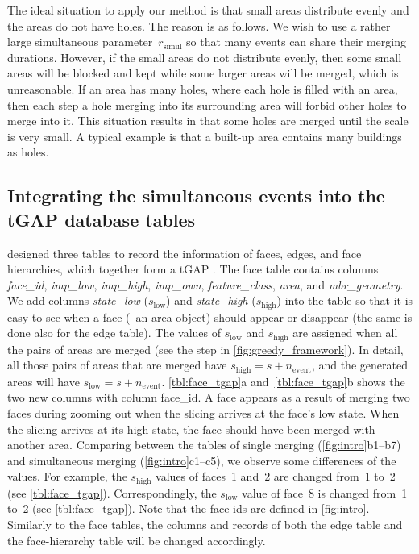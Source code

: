 \documentclass[twocolumn]{svjour3}          %
\begin{document}
The ideal situation to apply our method is that 
small areas distribute evenly and the areas do not have holes.
The reason is as follows.
We wish to use a rather large simultaneous parameter~$r_\mathrm{simul}$
so that many events can share their merging durations.
However, if the small areas do not distribute evenly,
then some small areas will be blocked and kept 
while some larger areas will be merged,
which is unreasonable.
If an area has many holes, where each hole is filled with an area, 
then each step a hole merging into its surrounding area will forbid
other holes to merge into it.
This situation results in that 
some holes are merged until the scale is very small.
A typical example is that 
a built-up area contains many buildings as holes.


\subsection{Integrating the simultaneous events into the tGAP database tables}
\label{sec:integrate_tgap}

\citet[]{Meijers2011Thesis} designed three tables 
to record the information of
faces, edges, and face hierarchies, 
which together form a tGAP
.
The face table contains columns \emph{face\_id}, 
\emph{imp\_low}, \emph{imp\_high}, \emph{imp\_own},
\emph{feature\_class}, \emph{area}, and \emph{mbr\_geometry}.
We add columns \emph{state\_low} ($s_\mathrm{low}$) 
and \emph{state\_high} ($s_\mathrm{high}$) into the table 
so that it is easy to see when a face (\ie~an area object) 
should appear or disappear 
(the same is done also for the edge table).
The values of $s_\mathrm{low}$ and $s_\mathrm{high}$
are assigned when all the pairs of areas are merged
(see the step in \fig\ref{fig:greedy_framework}).
In detail, all those pairs of areas that are merged have 
$s_\mathrm{high} = s + n_\mathrm{event}$,
and the generated areas will have 
$s_\mathrm{low} = s + n_\mathrm{event}$.
\tabls\ref{tbl:face_tgap}a and~\ref{tbl:face_tgap}b 
shows the two new columns with column face\_id.
A face appears as a result of merging two faces during zooming out 
when the slicing arrives at the face's low state.
When the slicing arrives at its high state,
the face should have been merged with another area.
Comparing between the tables of single merging 
(\figs\ref{fig:intro}b1--b7)
and simultaneous merging (\figs\ref{fig:intro}c1--c5),
we observe some differences of the values.
For example, the $s_\mathrm{high}$ values of faces~1 and~2 
are changed from~1 to~2 (see \tabl\ref{tbl:face_tgap}).
Correspondingly, the $s_\mathrm{low}$ value of face~8 is changed from~1 to~2
(see \tabl\ref{tbl:face_tgap}).
Note that the face ids are defined in \fig\ref{fig:intro}.
Similarly to the face tables, 
the columns and records of both the edge table and the face-hierarchy table 
will be changed accordingly.
\end{document}
